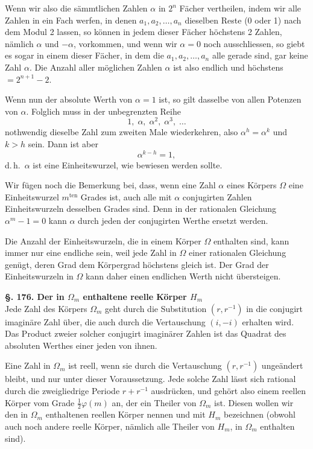 \documentclass[12pt,a4paper]{article}
\begin{document}
Wenn wir also die sämmtlichen Zahlen $\alpha$ in $2^n$ Fächer vertheilen, indem wir alle Zahlen in ein Fach werfen, in denen $a_1, a_2, \ldots, a_n$ dieselben Reste (0 oder 1) nach dem Modul 2 lassen, so können in jedem dieser Fächer höchstens 2 Zahlen, nämlich $\alpha$ und $-\alpha$, vorkommen, und wenn wir $\alpha = 0$ noch ausschliessen, so giebt es sogar in einem dieser Fächer, in dem die $a_1, a_2, \ldots, a_n$ alle gerade sind, gar keine Zahl $\alpha$. Die Anzahl aller möglichen Zahlen $\alpha$ ist also endlich und höchstens $= 2^{n+1} - 2$.

Wenn nun der absolute Werth von $\alpha = 1$ ist, so gilt dasselbe von allen Potenzen von $\alpha$. Folglich muss in der unbegrenzten Reihe
\[
1,\; \alpha,\; \alpha^2,\; \alpha^3,\; \ldots
\]
nothwendig dieselbe Zahl zum zweiten Male wiederkehren, also $\alpha^h = \alpha^k$ und $k > h$ sein. Dann ist aber
\[
\alpha^{k-h} = 1,
\]
d.\,h.\ $\alpha$ ist eine Einheitswurzel, wie bewiesen werden sollte.

Wir fügen noch die Bemerkung bei, dass, wenn eine Zahl $\alpha$ eines Körpers $\Omega$ eine Einheitswurzel $m^{\text{ten}}$ Grades ist, auch alle mit $\alpha$ conjugirten Zahlen Einheitswurzeln desselben Grades sind. Denn in der rationalen Gleichung $\alpha^m - 1 = 0$ kann $\alpha$ durch jeden der conjugirten Werthe ersetzt werden.

Die Anzahl der Einheitswurzeln, die in einem Körper $\Omega$ enthalten sind, kann immer nur eine endliche sein, weil jede Zahl in $\Omega$ einer rationalen Gleichung genügt, deren Grad dem Körpergrad höchstens gleich ist. Der Grad der Einheitswurzeln in $\Omega$ kann daher einen endlichen Werth nicht übersteigen.

\bigskip\noindent\textbf{\S. 176. Der in $\Omega_m$ enthaltene reelle Körper $H_m$}\\[4pt]

Jede Zahl des Körpers $\Omega_m$ geht durch die Substitution $(r, r^{-1})$ in die conjugirt imaginäre Zahl über, die auch durch die Vertauschung $(i, -i)$ erhalten wird. Das Product zweier solcher conjugirt imaginärer Zahlen ist das Quadrat des absoluten Werthes einer jeden von ihnen.

Eine Zahl in $\Omega_m$ ist reell, wenn sie durch die Vertauschung $(r, r^{-1})$ ungeändert bleibt, und nur unter dieser Voraussetzung. Jede solche Zahl lässt sich rational durch die zweigliedrige Periode $r + r^{-1}$ ausdrücken, und gehört also einem reellen Körper vom Grade $\frac{1}{2}\varphi(m)$ an, der ein Theiler von $\Omega_m$ ist. Diesen wollen wir den in $\Omega_m$ enthaltenen reellen Körper nennen und mit $H_m$ bezeichnen (obwohl auch noch andere reelle Körper, nämlich alle Theiler von $H_m$, in $\Omega_m$ enthalten sind).
\end{document}
